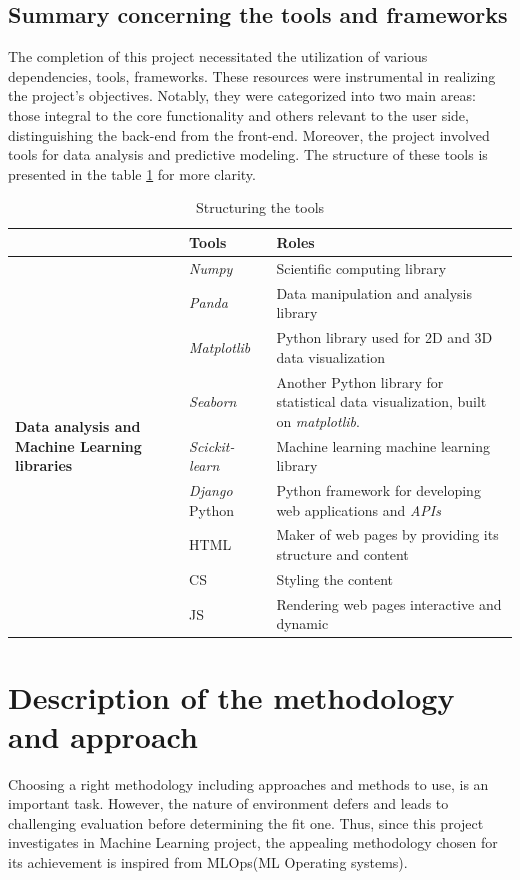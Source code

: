 \documentclass[12pt,a4paper]{report}
\begin{document}
\subsection{Summary concerning the tools and frameworks}
The completion of this project necessitated the utilization of various dependencies, tools, frameworks. These resources were instrumental in realizing the project's objectives. Notably, they were categorized into two main areas: those integral to the core functionality and others relevant to the user side, distinguishing the back-end from the front-end. Moreover, the project involved tools for data analysis and predictive modeling. The structure of these tools is presented in the  table \ref{tableStructuring}  for more clarity.
  \\
\begin{table}
\begin{tabular}{|p{4.1cm}|p{4cm}|p{6cm}|}
	\cline{2-3} 
    \multicolumn{1}{c|}{} &  \textbf{Tools}   &  \textbf{Roles}  \\
	\hline
\multirow{11}{4cm}{\textbf{Data analysis and Machine Learning libraries}}	& \textit{Numpy} & Scientific computing library   \\ 
	\cline{2-3} 
	& \textit{Panda}  & Data manipulation and
	analysis library  \\ 
	\cline{2-3} 
	& \textit{Matplotlib}  & Python library used for 2D and 3D data visualization   \\ 
	\cline{2-3}  
	& \textit{Seaborn} & Another Python library for statistical data visualization, built on \textit{matplotlib}.\\
	\cline{2-3} 
		& \textit{Scickit-learn}  & Machine learning machine learning library \\
	\hline
	\multirow{5}{4cm}{\textbf{Programming Languages (\textit{Front-end} and \textit{Back-end})}}& \textit{Django} Python & Python framework for developing web applications and \textit{APIs}\\ 
	 \cline{2-3}
	 & HTML & Maker of web pages by providing
	 its structure and content \\ 
	 \cline{2-3}
	 & CS & Styling the content\\ 
	 \cline{2-3}
	 & JS & Rendering web pages interactive and dynamic \\
	 \hline
	
\end{tabular}
\caption{Structuring the tools} 
\label{tableStructuring}
\end{table} 
\section{Description of the methodology and approach}
Choosing a right methodology including approaches and methods to use, is an important task. However, the nature of environment defers and leads to challenging evaluation before determining the fit one. Thus, since this project investigates in Machine Learning project, the appealing methodology chosen for its achievement is inspired from MLOps(ML Operating systems).\\
\end{document}
